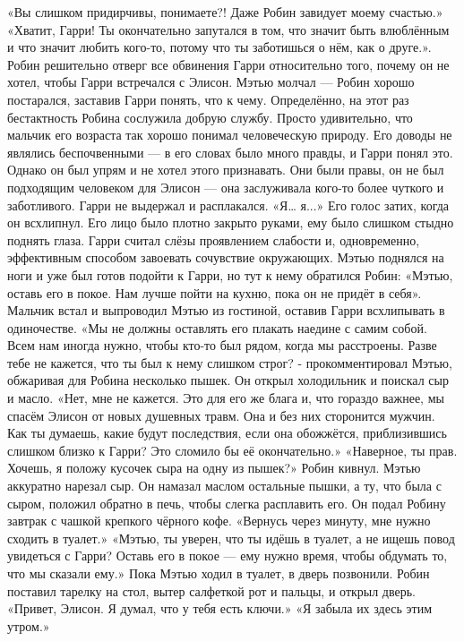 \documentclass[a4paper,12pt]{book}
\begin{document}
	«Вы слишком придирчивы, понимаете?! Даже Робин завидует моему счастью.»	
	«Хватит, Гарри! Ты окончательно запутался в том, что значит быть влюблённым и что значит любить кого-то, потому что ты заботишься о нём, как о друге.».
	Робин решительно отверг все обвинения Гарри относительно того, почему он не хотел, чтобы Гарри встречался с Элисон. Мэтью молчал — Робин хорошо постарался, заставив Гарри понять, что к чему. Определённо, на этот раз бестактность Робина сослужила добрую службу. Просто удивительно, что мальчик его возраста так хорошо понимал человеческую природу. Его доводы не являлись беспочвенными — в его словах было много правды, и Гарри понял это. Однако он был упрям и не хотел этого признавать. Они были правы, он не был подходящим человеком для Элисон — она заслуживала кого-то более чуткого и заботливого. Гарри не выдержал и расплакался. 
	«Я… я...»
	Его голос затих, когда он всхлипнул. Его лицо было плотно закрыто руками, ему было слишком стыдно поднять глаза. Гарри считал слёзы проявлением слабости и, одновременно, эффективным способом завоевать сочувствие окружающих.
	Мэтью поднялся на ноги и уже был готов подойти к Гарри, но тут к нему обратился Робин:
	«Мэтью, оставь его в покое. Нам лучше пойти на кухню, пока он не придёт в себя».
	Мальчик встал и выпроводил Мэтью из гостиной, оставив Гарри всхлипывать в одиночестве.
	«Мы не должны оставлять его плакать наедине с самим собой. Всем нам иногда нужно, чтобы кто-то был рядом, когда мы расстроены. Разве тебе не кажется, что ты был к нему слишком строг? - прокомментировал Мэтью, обжаривая для Робина несколько пышек. Он открыл холодильник и поискал сыр и масло.
	«Нет, мне не кажется. Это для его же блага и, что гораздо важнее, мы спасём Элисон от новых душевных травм. Она и без них сторонится мужчин. Как ты думаешь, какие будут последствия, если она обожжётся, приблизившись слишком близко к Гарри? Это сломило бы её окончательно.»
	«Наверное, ты прав. Хочешь, я положу кусочек сыра на одну из пышек?»
	Робин кивнул. Мэтью аккуратно нарезал сыр. Он намазал маслом остальные пышки, а ту, что была с сыром, положил обратно в печь, чтобы слегка расплавить его. Он подал Робину завтрак с чашкой крепкого чёрного кофе.
	«Вернусь через минуту, мне нужно сходить в туалет.»
	«Мэтью, ты уверен, что ты идёшь в туалет, а не ищешь повод увидеться с Гарри? Оставь его в покое — ему нужно время, чтобы обдумать то, что мы сказали ему.»
	Пока Мэтью ходил в туалет, в дверь позвонили. Робин поставил тарелку на стол, вытер салфеткой рот и пальцы, и открыл дверь.
	«Привет, Элисон. Я думал, что у тебя есть ключи.»
	«Я забыла их здесь этим утром.»
\end{document}

